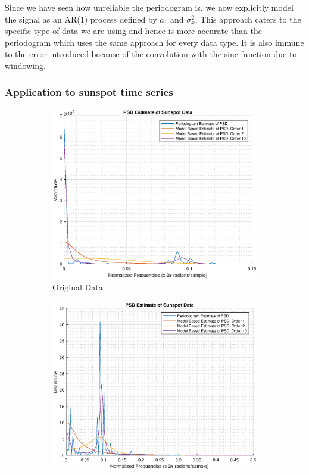 \documentclass{article}
\begin{document}
Since we have seen how unreliable the periodogram is, we now explicitly model the signal as an AR(1) process defined by $a_1$ and $\sigma_x^2$. This approach caters to the specific type of data we are using and hence is more accurate than the periodogram which uses the same approach for every data type. It is also immune to the error introduced because of the convolution with the sinc function due to windowing.

\pagebreak

\subsubsection{Application to sunspot time series}

\begin{figure}[h!]
\centering
\begin{subfigure}{0.32\textwidth}
\centering
\includegraphics[width = \textwidth]{ar_model_sunspot_orig}
\caption{Original Data}
\label{fig:ar_model_sunspot_orig}
\end{subfigure}
\begin{subfigure}{0.32\textwidth}
\centering
\includegraphics[width = \textwidth]{ar_model_sunspot}

\end{subfigure}
\end{figure}
\end{document}
